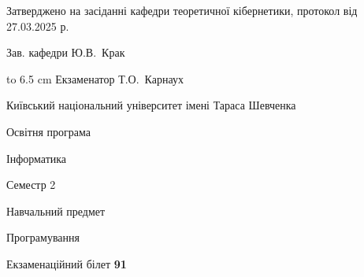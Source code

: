 \documentclass[12pt, ukrainian]{article}
\begin{document}
{\smallskip\smallskip \begin {scriptsize} Затверджено на засіданні кафедри теоретичної кібернетики, протокол   від   27.03.2025 р.\par\smallskip\smallskip\smallskip\smallskip
{\parbox {6.5 cm} {Зав. кафедри \dotfill Ю.В.~Крак}}\hspace {0.7cm} {\hbox to 6.5 cm { Екзаменатор \dotfill Т.О.~Карнаух}} \end{scriptsize}}
\newpage
{{\begin {scriptsize}\par
{ \center  Київський національний університет імені Тараса Шевченка \par}
{\parbox {5 cm}{Освітня програма \hfill}{\parbox {7 cm}{Інформатика\hfill}}\parbox {6 cm}{\hfill Семестр 2}}\par
{\parbox {5 cm} {Навчальний предмет \hfill}\parbox {7 cm}{Програмування \hfill}\parbox {6cm}{\hfill}\par}\vspace{-15pt} \end{scriptsize}}{\center Екзаменаційний білет \No \textbf { 91 }\par}}
\end{document}
